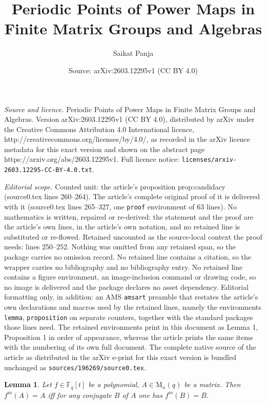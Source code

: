 \documentclass[10pt,a4paper]{amsart}
\title{Periodic Points of Power Maps in Finite Matrix Groups and Algebras}
\author{Saikat Panja}
\date{Source: arXiv:2603.12295v1 (CC BY 4.0)}
\newtheorem{lemma}{Lemma}
\newcommand{\F}{\mathbb{F}}
\newcommand{\M}{\mathrm{M}}
\begin{document}
\maketitle

\noindent\emph{Source and licence.} Periodic Points of Power Maps in Finite Matrix Groups and Algebras. Version arXiv:2603.12295v1 (CC BY 4.0), distributed by arXiv under the Creative Commons Attribution 4.0 International licence, http://creativecommons.org/licenses/by/4.0/, as recorded in the arXiv licence metadata for this exact version and shown on the abstract page https://arxiv.org/abs/2603.12295v1. Full licence notice: \texttt{licenses/arxiv-2603.12295-CC-BY-4.0.txt}.\par\smallskip

\noindent\textit{Editorial scope.} Counted unit: the article's proposition prop:candidacy (source0.tex lines 260--264). The article's complete original proof of it is delivered with it (source0.tex lines 265--327, one \texttt{proof} environment of 63 lines). No mathematics is written, repaired or re-derived: the statement and the proof are the article's own lines, in the article's own notation, and no retained line is substituted or re-flowed.  Retained uncounted as the source-local context the proof needs: lines 250--252.  Nothing was omitted from any retained span, so the package carries no omission record.  No retained line contains a citation, so the wrapper carries no bibliography and no bibliography entry.  No retained line contains a figure environment, an image-inclusion command or drawing code, so no image is delivered and the package declares no asset dependency.  Editorial formatting only, in addition: an AMS \texttt{amsart} preamble that restates the article's own declarations and macros used by the retained lines, namely the environments \texttt{lemma}, \texttt{proposition} on separate counters, together with the standard packages those lines need.  The retained environments print in this document as Lemma 1, Proposition 1 in order of appearance, whereas the article prints the same items with the numbering of its own full document.  The complete native source of the article as distributed in the arXiv e-print for this exact version is bundled unchanged as \texttt{sources/196269/source0.tex}.
\begin{lemma}\label{lem:conj}
    Let $f\in \F_q[t]$ be a polynomial, $A\in\M_n(q)$ be a matrix. Then $f^m(A)=A$ iff for any conjugate $B$ of $A$ one has $f^m(B)=B$.
\end{lemma}
\end{document}
